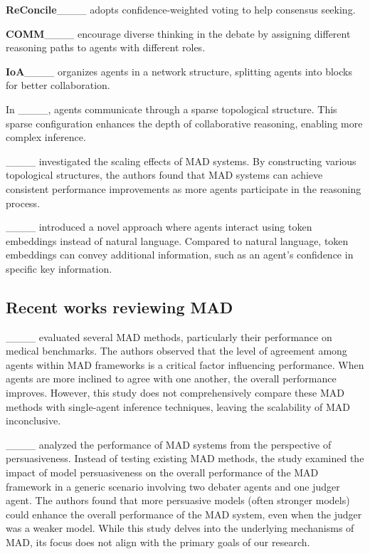 \textbf{ReConcile}____ adopts confidence-weighted voting to help consensus seeking. 

\textbf{COMM}____ encourage diverse thinking in the debate by assigning different reasoning paths to agents with different roles.

\textbf{IoA}____ organizes agents in a network structure, splitting agents into blocks for better collaboration. 

In ____, agents communicate through a sparse topological structure. This sparse configuration enhances the depth of collaborative reasoning, enabling more complex inference.

____ investigated the scaling effects of MAD systems. By constructing various topological structures, the authors found that MAD systems can achieve consistent performance improvements as more agents participate in the reasoning process.

____ introduced a novel approach where agents interact using token embeddings instead of natural language. Compared to natural language, token embeddings can convey additional information, such as an agent’s confidence in specific key information.

\subsection{Recent works reviewing MAD}

____ evaluated several MAD methods, particularly their performance on medical benchmarks. The authors observed that the level of agreement among agents within MAD frameworks is a critical factor influencing performance. When agents are more inclined to agree with one another, the overall performance improves. However, this study does not comprehensively compare these MAD methods with single-agent inference techniques, leaving the scalability of MAD inconclusive. 

____ analyzed the performance of MAD systems from the perspective of persuasiveness. Instead of testing existing MAD methods, the study examined the impact of model persuasiveness on the overall performance of the MAD framework in a generic scenario involving two debater agents and one judger agent. The authors found that more persuasive models (often stronger models) could enhance the overall performance of the MAD system, even when the judger was a weaker model. While this study delves into the underlying mechanisms of MAD, its focus does not align with the primary goals of our research.

